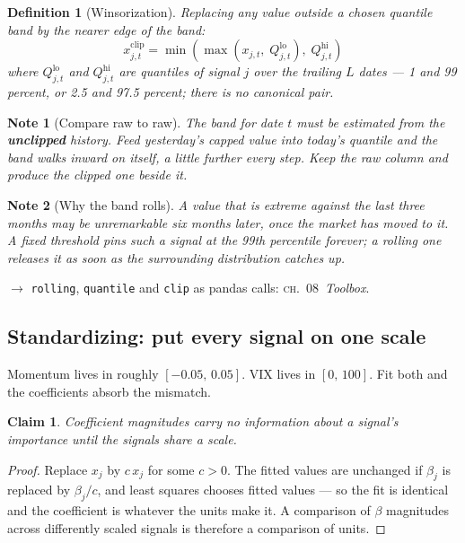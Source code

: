 \documentclass[11pt]{article}
\theoremstyle{runin}
\newtheorem*{definition}{Definition}
\newtheorem*{claim}{Claim}
\newtheorem*{note}{Note}
\newcommand{\ch}[2]{\textsc{ch.~#1}~\textit{#2}}
\begin{document}
\begin{definition}[Winsorization]
Replacing any value outside a chosen quantile band by the nearer edge of the band:
\[
  x^{\mathrm{clip}}_{j,t}
  = \min\!\left( \max\!\left( x_{j,t},\; Q^{\mathrm{lo}}_{j,t} \right),\; Q^{\mathrm{hi}}_{j,t} \right)
\]
where $Q^{\mathrm{lo}}_{j,t}$ and $Q^{\mathrm{hi}}_{j,t}$ are quantiles of signal $j$ over the
trailing $L$ dates --- 1 and 99 percent, or 2.5 and 97.5 percent; there is no canonical pair.
\end{definition}

\begin{note}[Compare raw to raw]
The band for date $t$ must be estimated from the \textbf{unclipped} history. Feed yesterday's
capped value into today's quantile and the band walks inward on itself, a little further every
step. Keep the raw column and produce the clipped one beside it.
\end{note}

\begin{note}[Why the band rolls]
A value that is extreme against the last three months may be unremarkable six months later, once
the market has moved to it. A fixed threshold pins such a signal at the 99th percentile forever; a
rolling one releases it as soon as the surrounding distribution catches up.
\end{note}

$\rightarrow$ \texttt{rolling}, \texttt{quantile} and \texttt{clip} as pandas calls:
\ch{08}{Toolbox}.

\subsection{Standardizing: put every signal on one scale}
\label{sec:standardize}

Momentum lives in roughly $[-0.05,\, 0.05]$. VIX lives in $[0,\, 100]$. Fit both and the
coefficients absorb the mismatch.

\begin{claim}
Coefficient magnitudes carry no information about a signal's importance until the signals share a
scale.
\end{claim}

\begin{proof}
Replace $x_j$ by $c\,x_j$ for some $c > 0$. The fitted values are unchanged if $\beta_j$ is
replaced by $\beta_j / c$, and least squares chooses fitted values --- so the fit is identical and
the coefficient is whatever the units make it. A comparison of $\beta$ magnitudes across
differently scaled signals is therefore a comparison of units.
\end{proof}
\end{document}
